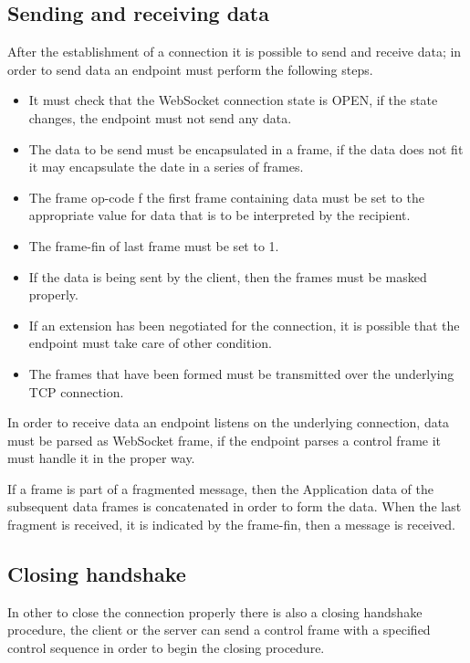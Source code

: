 \subsection{Sending and receiving data}
After the establishment of a connection it is possible to send and receive data; in order to send data an endpoint must perform the following steps.
\begin{itemize}
	\item It must check that the WebSocket connection state is OPEN, if the state changes, the endpoint must not send any data.
	\item The data to be send must be encapsulated in a frame, if the data does not fit it may encapsulate the date in a series of frames.
	\item The frame op-code f the first frame containing data must be set to the appropriate value for data that is to be interpreted by the recipient.
	\item The frame-fin of last frame must be set to 1.
	\item If the data is being sent by the client, then the frames must be masked properly.
	\item If an extension has been negotiated for the connection, it is possible that the endpoint must take care of other condition.
	\item The frames that have been formed must be transmitted over the underlying TCP connection.
\end{itemize}

In order to receive data an endpoint listens on the underlying connection, data must be parsed as WebSocket frame,
if the endpoint parses a control frame it must handle it in the proper way.\newline

If a frame is part of a fragmented message, then the Application data of the subsequent data frames is concatenated in order to form the data.\newline
When the last fragment is received, it is indicated by the frame-fin, then a message is received.\newline

\subsection{Closing handshake}
In other to close the connection properly there is also a closing handshake procedure, the client or
the server can send a control frame with a specified control sequence in order to begin the closing procedure.\newline

